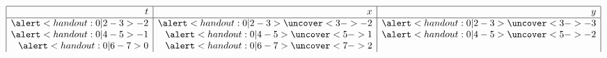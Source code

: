 \begin{frame}
\begin{example}
\begin{columns}[c]
{}%
%
%
%
\[
\begin{array}{|r|r|r|}
\hline
t & x & y\\
\hline
\alert<handout:0| 2-3>{-2} &%
\alert<handout:0| 2-3>{\uncover<3->{-2}} &%
\alert<handout:0| 2-3>{\uncover<3->{-3}} \\%
\alert<handout:0| 4-5>{-1} &%
\alert<handout:0| 4-5>{\uncover<5->{1}} &%
\alert<handout:0| 4-5>{\uncover<5->{-2}} \\%
\alert<handout:0| 6-7>{0} &%
\alert<handout:0| 6-7>{\uncover<7->{2}} &%

\end{array}\]
\end{columns}
\end{example}
\end{frame}

